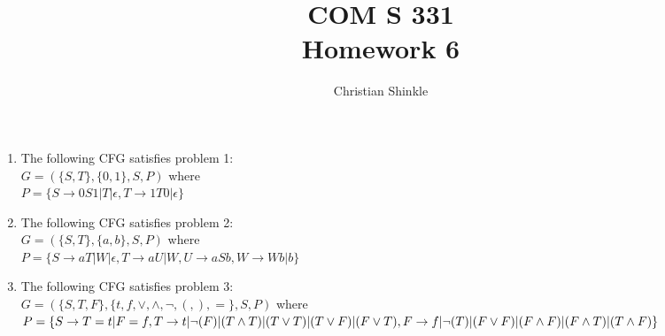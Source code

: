 \documentclass{article}
\newcommand{\ra}{\rightarrow}
\begin{document}
 	\title{COM S 331\large \\Homework 6}
	\author{Christian Shinkle}
	\maketitle
	\begin {enumerate}
		\item The following CFG satisfies problem 1:\\
		$G=(\{S,T\}, \{0,1\}, S, P)$ where \\
		$P=\{S\ra0S1|T|\epsilon , T\ra1T0|\epsilon\}$ 

		\item The following CFG satisfies problem 2:\\
		$G=(\{S,T\},\{a,b\},S,P)$ where\\
		$P=\{S\ra aT|W|\epsilon, T\ra aU|W, U\ra aSb, W\ra Wb|b\}$
		
		\item The following CFG satisfies problem 3:\\
		$G=(\{S,T,F\},\{t,f, \vee, \wedge, \neg, (, ), =\}, S, P)$ where \\
		$P=\{S\ra T=t|F=f,\\
		T\ra t|\neg(F)|(T\wedge T)|(T\vee T)|(T\vee F)|(F\vee T),\\
		F\ra f|\neg(T)|(F\vee F)|(F\wedge F)|(F\wedge T)|(T\wedge F)\}$ 
	\end{enumerate}
 
\end{document}
